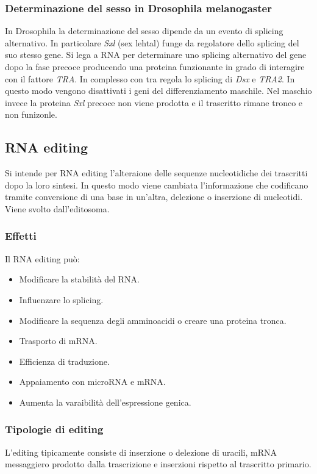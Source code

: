 		\subsubsection{Determinazione del sesso in Drosophila melanogaster}
		In Drosophila la determinazione del sesso dipende da un evento di splicing alternativo.
		In particolare \emph{Sxl} (sex lehtal) funge da regolatore dello splicing del suo stesso gene.
		Si lega a RNA per determinare uno splicing alternativo del gene dopo la fase precoce producendo una proteina funzionante in grado di interagire con il fattore \emph{TRA}.
		In complesso con tra regola lo splicing di \emph{Dsx} e \emph{TRA2}.
		In questo modo vengono disattivati i geni del differenziamento maschile.
		Nel maschio invece la proteina \emph{Sxl} precoce non viene prodotta e il trascritto rimane tronco e non funizonle.

	\subsection{RNA editing}
	Si intende per RNA editing l'alteraione delle sequenze nucleotidiche dei trascritti dopo la loro sintesi.
	In questo modo viene cambiata l'informazione che codificano tramite conversione di una base in un'altra, delezione o inserzione di nucleotidi.
	Viene svolto dall'editosoma.
	
		\subsubsection{Effetti}
		Il RNA editing pu\`o:
		\begin{multicols}{2}
			\begin{itemize}
				\item Modificare la stabilit\`a del RNA.
				\item Influenzare lo splicing.
				\item Modificare la sequenza degli amminoacidi o creare una proteina tronca.
				\item Trasporto di mRNA.
				\item Efficienza di traduzione.
				\item Appaiamento con microRNA e mRNA.
				\item Aumenta la varaibilit\`a dell'espressione genica.
			\end{itemize}
		\end{multicols}

		\subsubsection{Tipologie di editing}
		L'editing tipicamente consiste di inserzione o delezione di uracili, mRNA messaggiero prodotto dalla trascrizione e inserzioni rispetto al trascritto primario.

